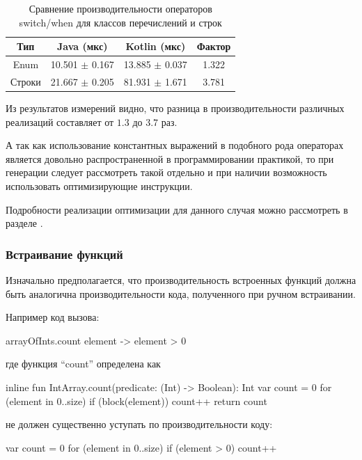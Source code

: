 \begin{table}[h]
\begin{center}
\begin{tabular}{|c|c|c|c|} \hline
Тип & Java (мкс) & Kotlin (мкс) & Фактор \\ \hline
Enum & 10.501 $\pm$ 0.167 & 13.885 $\pm$ 0.037 & 1.322\\ \hline
Строки & 21.667 $\pm$ 0.205 & 81.931 $\pm$ 1.671 & 3.781\\ \hline
\end{tabular}
\caption{Сравнение производительности операторов switch/when для классов перечислений и строк}
\end{center}
\end{table}

Из результатов измерений видно, что разница в производительности различных реализаций
составляет от $1.3$ до $3.7$ раз.

А так как использование константных выражений в подобного рода операторах является довольно
распространенной в программировании практикой, то при генерации следует рассмотреть такой
отдельно и при наличии возможность использовать оптимизирующие инструкции.

Подробности реализации оптимизации для данного случая можно рассмотреть в разделе . %

\subsubsection{Встраивание функций}
Изначально предполагается, что производительность встроенных функций должна быть аналогична
производительности кода, полученного при ручном встраивании.

Например код вызова:
\begin{pyglist}[language=kotlin]
    arrayOfInts.count { element -> element > 0 }
\end{pyglist}

где функция ``count'' определена как
\begin{pyglist}[language=kotlin]
    inline fun IntArray.count(predicate: (Int) -> Boolean): Int {
        var count = 0
        for (element in 0..size) {
            if (block(element)) {
                count++
            }
        }
        return count
    }
\end{pyglist}
не должен существенно уступать по производительности коду:
\begin{pyglist}[language=kotlin]
        var count = 0
        for (element in 0..size) {
            if (element > 0) {
                count++
            }
        }
\end{pyglist}


